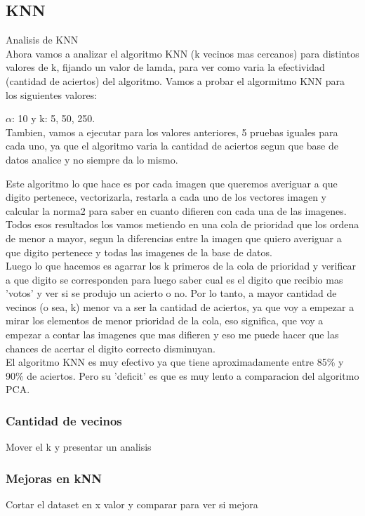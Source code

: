 \subsection{KNN}
Analisis de KNN
\\
Ahora vamos a analizar el algoritmo KNN (k vecinos mas cercanos) para distintos valores de k, fijando un valor de lamda, para ver como varia la efectividad (cantidad de aciertos) del algoritmo.
Vamos a probar el algormitmo KNN para los siguientes valores:

$\alpha$: 10  y k: 5, 50, 250.\\

Tambien, vamos a ejecutar para los valores anteriores, 5 pruebas iguales para cada uno, ya que el algoritmo varia la cantidad de aciertos segun que base de datos analice y no siempre da lo mismo.

Este algoritmo lo que hace es por cada imagen que queremos averiguar a que digito pertenece, vectorizarla, restarla a cada uno de los vectores imagen y calcular la norma2 para saber en cuanto difieren con cada una de las imagenes.
Todos esos resultados los vamos metiendo en una cola de prioridad que los ordena de menor a mayor, segun la diferencias entre la imagen que quiero averiguar a que digito pertenece y todas las imagenes de la base de datos.
\\
Luego lo que hacemos es agarrar los k primeros de la cola de prioridad y verificar a que digito se corresponden para luego saber cual es el digito que recibio mas 'votos' y ver si se produjo un acierto o no.
Por lo tanto, a mayor cantidad de vecinos (o sea, k) menor va a ser la cantidad de aciertos, ya que voy a empezar a mirar los elementos de menor prioridad de la cola, eso significa, que voy a empezar a contar las imagenes que mas difieren y eso me puede hacer que las chances de acertar el digito correcto disminuyan.
\\
El algoritmo KNN es muy efectivo ya que tiene aproximadamente entre 85\% y 90\% de aciertos. Pero su 'deficit' es que es muy lento a comparacion del algoritmo PCA. 







\subsubsection{Cantidad de vecinos}
Mover el k y presentar un analisis

\subsubsection{Mejoras en kNN}
Cortar el dataset en x valor y comparar para ver si mejora

